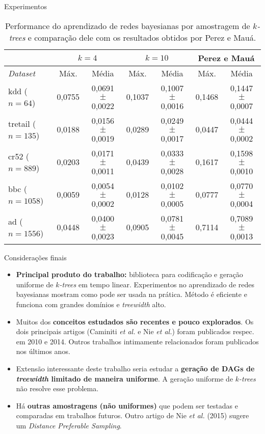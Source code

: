 \documentclass{beamer}
\begin{document}
\begin{frame}
\begin{columns}[t]
\begin{column}{0.5\textwidth}
\begin{block}{Experimentos}
\begin{table}
      {\small
        \begin{tabular}{l c c c c c c} \hline
          & \multicolumn{2}{c}{$k = 4$} & \multicolumn{2}{c}{$k = 10$} & \multicolumn{2}{c}{Perez e Mauá} \\ \hline
          \emph{Dataset} & Máx. & Média & Máx. & Média & Máx. & Média \\ \hline
          kdd ($n = 64$) & 0,0755 & 0,0691 $\pm$ 0,0022 & 0,1037 & 0,1007 $\pm$ 0,0016 & 0,1468 & 0,1447 $\pm$ 0,0007 \\
          tretail ($n = 135$) & 0,0188 & 0,0156 $\pm$ 0,0019 & 0,0289 & 0,0249 $\pm$ 0,0017 & 0,0447 & 0,0444 $\pm$ 0,0002 \\
          cr52 ($n = 889$) & 0,0203 & 0,0171 $\pm$ 0,0011 & 0,0439 & 0,0333 $\pm$ 0,0028 & 0,1617 & 0,1598 $\pm$ 0,0010 \\
          bbc ($n = 1058$) & 0,0059 & 0,0054 $\pm$ 0,0002 & 0,0128 & 0,0102 $\pm$ 0,0005 & 0,0777 & 0,0770 $\pm$ 0,0004 \\
          ad ($n = 1556$) & 0,0448 & 0,0400 $\pm$ 0,0023 & 0,0905 & 0,0781 $\pm$ 0,0045 & 0,7114 & 0,7089 $\pm$ 0,0013 \\ \hline
        \end{tabular}
      }

      \caption{Performance do aprendizado de redes bayesianas por amostragem de \emph{$k$-trees} e comparação dele com os resultados obtidos por Perez e Mauá.}
      \label{tab:comparacao}
    \end{table}
  \end{block}

  \begin{block}{Considerações finais}
    \begin{itemize}
      \item \textbf{Principal produto do trabalho:} biblioteca para codificação e geração uniforme de \emph{$k$-trees} em tempo linear. Experimentos no aprendizado de redes bayesianas mostram como pode ser usada na prática. Método é eficiente e funciona com grandes domínios e \emph{treewidth} alto.
      \item Muitos dos \textbf{conceitos estudados são recentes e pouco explorados}. Os dois principais artigos (Caminiti \emph{et al.} e Nie \emph{et al.}) foram publicados respec. em 2010 e 2014. Outros trabalhos intimamente relacionados foram publicados nos últimos anos.
      \item Extensão interessante deste trabalho seria estudar a \textbf{geração de DAGs de \emph{treewidth} limitado de maneira uniforme}. A geração uniforme de \emph{$k$-trees} não resolve esse problema.
      \item Há \textbf{outras amostragens (não uniformes)} que podem ser testadas e comparadas em trabalhos futuros. Outro artigo de Nie \emph{et al.} (2015) \cite{nie} sugere um \emph{Distance Preferable Sampling}.
    \end{itemize}
  \end{block}


\end{column}
\end{columns}
\end{frame}
\end{document}
